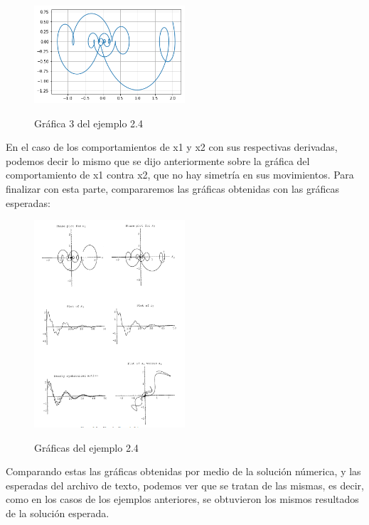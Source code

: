\documentclass{article}
\begin{document}
\begin{figure}[H]
    \caption{Gráfica 3 del ejemplo 2.4}
    \includegraphics[width=0.5\textwidth]{Grafica13.png}
    \centering
    \label{Cod}
\end{figure}
En el caso de los comportamientos de x1 y x2 con sus respectivas derivadas, podemos decir lo mismo que se dijo anteriormente sobre la gráfica del comportamiento de x1 contra x2, que no hay simetría en sus movimientos.
Para finalizar con esta parte, compararemos las gráficas obtenidas con las gráficas esperadas:
\begin{figure}[H]
    \caption{Gráficas del ejemplo 2.4}
    \includegraphics[width=0.5\textwidth]{Ejemplo4.PNG}
    \centering
    \label{Cod}
\end{figure}
Comparando estas las gráficas obtenidas por medio de la solución númerica, y las esperadas del archivo de texto, podemos ver que se tratan de las mismas, es decir, como en los casos de los ejemplos anteriores, se obtuvieron los mismos resultados de la solución esperada.
\end{document}

